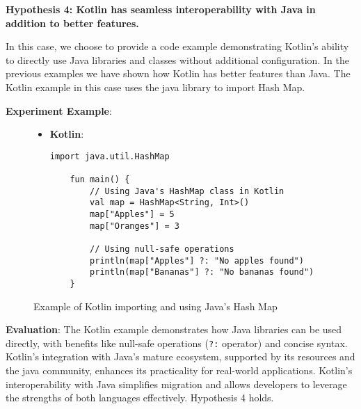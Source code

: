 \vspace{1em}


\noindent \textbf{Hypothesis 4: Kotlin has seamless interoperability with Java in addition to better features.}

\vspace{1em}

\noindent In this case, we choose to provide a code example demonstrating Kotlin's ability to directly use Java libraries and classes without additional configuration. In the previous examples we have shown how Kotlin has better features than Java. The Kotlin example in this case uses the java library to import Hash Map.

\vspace{1em}

\noindent \textbf{Experiment Example}:

\begin{figure}[H]
\centering	
\begin{tcolorbox}[colframe=blue!80!black, colback=blue!5!white, coltitle=blue!50!black, title={-}, boxrule=0.5mm, width=0.8\textwidth, sharp corners=south]
    \begin{itemize}
        \item \textbf{\scriptsize Kotlin}:
        \begin{lstlisting}[style=kotlin, basicstyle=\tiny\ttfamily]
    import java.util.HashMap

    fun main() {
        // Using Java's HashMap class in Kotlin
        val map = HashMap<String, Int>()
        map["Apples"] = 5
        map["Oranges"] = 3

        // Using null-safe operations
        println(map["Apples"] ?: "No apples found")
        println(map["Bananas"] ?: "No bananas found")
    }
        \end{lstlisting}
    \end{itemize}
\end{tcolorbox}
\caption{Example of Kotlin importing and using Java's Hash Map}
\label{fig:import_hashmap}
\end{figure}

\vspace{1em}

\noindent \textbf{Evaluation}: The Kotlin example demonstrates how Java libraries can be used directly, with benefits like null-safe operations (\texttt{?:} operator) and concise syntax. Kotlin's integration with Java's mature ecosystem, supported by its resources and the java community, enhances its practicality for real-world applications.  Kotlin’s interoperability with Java simplifies migration and allows developers to leverage the strengths of both languages effectively. Hypothesis 4 holds.


